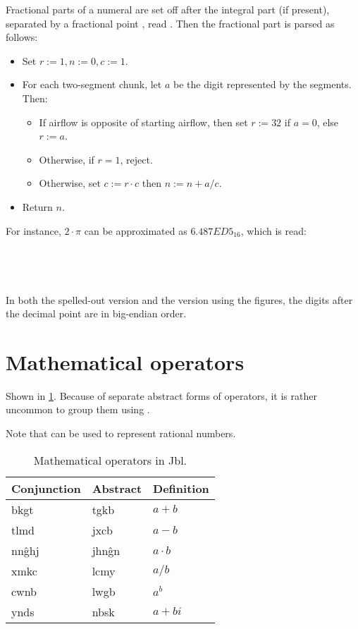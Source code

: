 \documentclass{book}
\newcommand{\lname}{Jbl}
\begin{document}
Fractional parts of a numeral are set off after the integral part (if present), separated by a fractional point \hortho{\textvariko{,}}, read . Then the fractional part is parsed as follows:

\begin{itemize}
  \item Set $r := 1, n := 0, c := 1$.
  \item For each two-segment chunk, let $a$ be the digit represented by the segments. Then:
  \begin{itemize}
    \item If airflow is opposite of starting airflow, then set $r := 32$ if $a = 0$, else $r := a$.
    \item Otherwise, if $r = 1$, reject.
    \item Otherwise, set $c := r \cdot c$ then $n := n + a / c$.
  \end{itemize}
  \item Return $n$.
\end{itemize}

For instance, $2 \cdot \pi$ can be approximated as $6.487ED5_{16}$, which is read: \\
~\\
 \\
 \\
 \\

In both the spelled-out version and the version using the figures, the digits after the decimal point are in big-endian order.

\section{Mathematical operators}

Shown in \ref{table:operators}. Because of separate abstract forms of operators, it is rather uncommon to group them using .

Note that  can be used to represent rational numbers.

\begin{table}[ht]
  \caption{Mathematical operators in \lname. \label{table:operators}}
  \centering
  \begin{tabular}{>{\kardinal}l|>{\kardinal}l|l}
    \textnormal{Conjunction} & \textnormal{Abstract} & Definition \\
    \hline
    bkgt & tgkb & $a + b$ \\
    tlmd & jxcb & $a - b$ \\
    nn\^ghj & jhn\^gn & $a \cdot b$ \\
    xmkc & lcmy & $a / b$ \\
    cwnb & lwgb & $a^b$ \\
    ynds & nbsk & $a + bi$ \\
  \end{tabular}
\end{table}
\end{document}
